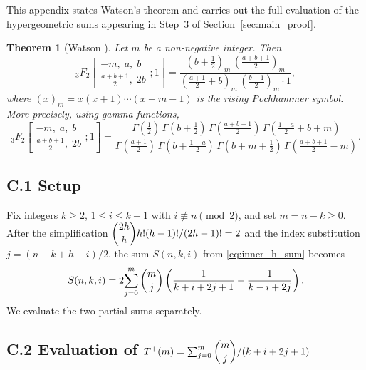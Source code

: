 \documentclass[12pt,a4paper]{article}
\newtheorem{theorem}{Theorem}[section]
\theoremstyle{definition}
\renewcommand{\binom}[2]{\dbinom{#1}{#2}}
\begin{document}
This appendix states Watson's theorem and carries out the full evaluation
of the hypergeometric sums appearing in Step~3 of Section~\ref{sec:main_proof}.

\begin{theorem}[Watson \cite{Watson1925}]
\label{thm:watson}
Let $m$ be a non-negative integer.  Then
\[
{}_3F_2\!\left[\begin{matrix}-m,\;a,\;b\\[2pt]
              \tfrac{a+b+1}{2},\;2b\end{matrix};1\right]
=
\frac{(b+\tfrac{1}{2})_m\,(\tfrac{a+b+1}{2})_m}
     {(\tfrac{a+1}{2}+b)_m\,(\tfrac{b+1}{2})_m\cdot 1},
\]
where $(x)_m = x(x+1)\cdots(x+m-1)$ is the rising Pochhammer symbol.
More precisely, using gamma functions,
\[
{}_3F_2\!\left[\begin{matrix}-m,\;a,\;b\\[2pt]
              \tfrac{a+b+1}{2},\;2b\end{matrix};1\right]
=
\frac{\Gamma(\tfrac{1}{2})\,\Gamma(b+\tfrac{1}{2})\,
      \Gamma(\tfrac{a+b+1}{2})\,\Gamma(\tfrac{1-a}{2}+b+m)}
     {\Gamma(\tfrac{a+1}{2})\,\Gamma(b+\tfrac{1-a}{2})\,
      \Gamma(b+m+\tfrac{1}{2})\,\Gamma(\tfrac{a+b+1}{2}-m)}.
\]
\end{theorem}

\subsection*{C.1 Setup}

Fix integers $k \ge 2$, $1 \le i \le k-1$ with $i \not\equiv n \pmod{2}$,
and set $m = n-k \ge 0$.  After the simplification
$\binom{2h}{h}h!(h-1)!/(2h-1)! = 2$ and the index substitution
$j = (n-k+h-i)/2$, the sum $S(n,k,i)$ from \eqref{eq:inner_h_sum} becomes
\[
S(n,k,i)
= 2\!\sum_{j=0}^{m}\binom{m}{j}
  \left(\frac{1}{k+i+2j+1}-\frac{1}{k-i+2j}\right).
\]
We evaluate the two partial sums separately.

\subsection*{C.2 Evaluation of $T^+(m) = \sum_{j=0}^{m}\binom{m}{j}/(k+i+2j+1)$}
\end{document}

